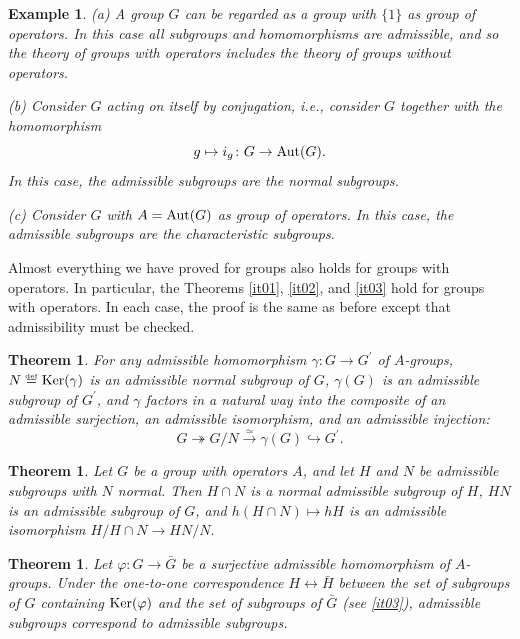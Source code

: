 \documentclass[a4paper,11pt,final]{memoir}%
\newtheorem{theorem}[X]{Theorem}
\newtheorem{example}[X]{Example}
\theoremstyle{nonumberplain}
\begin{document}
\begin{example}
\label{ns23}(a) A group $G$ can be regarded as a group with $\{1\}$ as group
of operators. In this case all subgroups and homomorphisms are admissible, and
so the theory of groups with operators includes the theory of groups without operators.

(b) Consider $G$ acting on itself by conjugation, i.e., consider $G$ together
with the homomorphism
\[
g\mapsto i_{g}\colon G\rightarrow\operatorname{Aut}(G).
\]
In this case, the admissible subgroups are the normal subgroups.

(c) Consider $G$ with $A=\operatorname{Aut}(G)$ as group of operators. In this case, the
admissible subgroups are the characteristic subgroups.
\end{example}

Almost everything we have proved for groups also holds for groups with
operators. In particular, the Theorems \ref{it01}, \ref{it02}, and \ref{it03}
hold for groups with operators. In each case, the proof is the same as before
except that admissibility must be checked.

\begin{theorem}
\label{ns24}For any admissible homomorphism $\gamma\colon G\rightarrow
G^{\prime}$ of $A$-groups, $N\overset{\df}{=}\Ker(\gamma)$ is
an admissible normal subgroup of $G$, $\gamma(G)$ is an admissible subgroup of
$G^{\prime}$, and $\gamma$ factors in a natural way into the composite of an
admissible surjection, an admissible isomorphism, and an admissible
injection:
\[
G\twoheadrightarrow G/N\overset{\simeq}{\rightarrow}\gamma(G)\hookrightarrow
G^{\prime}.
\]

\end{theorem}

\begin{theorem}
\label{ns25}Let $G$ be a group with operators $A$, and let $H$ and $N$ be
admissible subgroups with $N$ normal. Then $H\cap N$ is a normal admissible
subgroup of $H$, $HN$ is an admissible subgroup of $G$, and $h(H\cap N)\mapsto
hH$ is an admissible isomorphism $H/H\cap N\rightarrow HN/N.$
\end{theorem}

\begin{theorem}
\label{ns26}Let $\varphi\colon G\rightarrow\bar{G}$ be a surjective admissible
homomorphism of $A$-groups. Under the one-to-one correspondence
$H\leftrightarrow\bar{H}$ between the set of subgroups of $G$ containing
$\operatorname{Ker}(\varphi)$ and the set of subgroups of $\bar{G}$ (see \ref{it03}),
admissible subgroups correspond to admissible subgroups.
\end{theorem}
\end{document}
